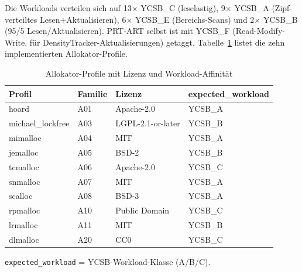 Die Workloads verteilen sich auf 13$\times$ YCSB\_C (leselastig), 9$\times$ YCSB\_A (Zipf-verteiltes
Lesen+Aktualisieren), 6$\times$ YCSB\_E (Bereichs-Scans) und 2$\times$ YCSB\_B (95/5
Lesen/Aktualisieren). PRT-ART selbst ist mit YCSB\_F (Read-Modify-Write, für
DensityTracker-Aktualisierungen) getaggt. Tabelle~\ref{tab:allocator-profiles} listet die zehn
implementierten Allokator-Profile.

\begin{table}[!htbp]
  \caption{Allokator-Profile mit Lizenz und Workload-Affinität}\label{tab:allocator-profiles}
  \centering\small
  \begin{tabular}{llll}
    \toprule
    \textbf{Profil} & \textbf{Familie} & \textbf{Lizenz} & \textbf{expected\_workload} \\
    \midrule
    hoard & A01 & Apache-2.0 & YCSB\_A \\
    michael\_lockfree & A03 & LGPL-2.1-or-later & YCSB\_B \\
    mimalloc & A04 & MIT & YCSB\_A \\
    jemalloc & A05 & BSD-2 & YCSB\_B \\
    tcmalloc & A06 & Apache-2.0 & YCSB\_C \\
    snmalloc & A07 & MIT & YCSB\_A \\
    scalloc & A08 & BSD-3 & YCSB\_A \\
    rpmalloc & A10 & Public Domain & YCSB\_C \\
    lrmalloc & A11 & MIT & YCSB\_B \\
    dlmalloc & A20 & CC0 & YCSB\_C \\
    \bottomrule
  \end{tabular}

  \smallskip
  {\footnotesize \texttt{expected\_workload} = YCSB-Workload-Klasse (A/B/C).\par}
\end{table}

